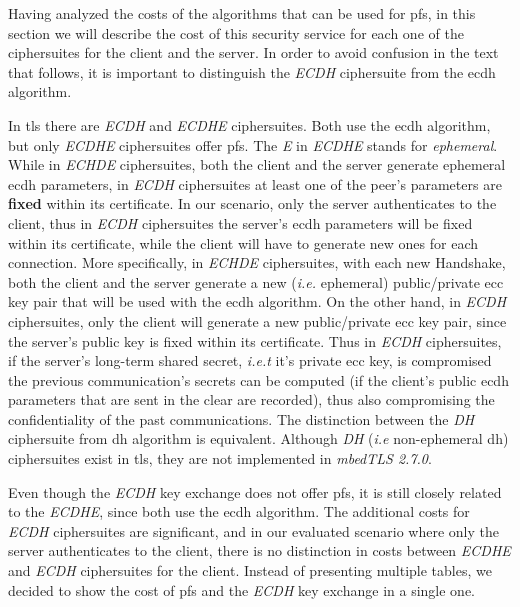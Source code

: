 \documentclass{llncs}
\begin{document}
Having analyzed the costs of the algorithms that can be used for \gls{pfs}, in this section we will describe the cost of this security service
for each one of the ciphersuites for the client and the server. In order to avoid confusion in the text that follows, it is important to
distinguish the \textit{ECDH} ciphersuite from the \gls{ecdh} algorithm.

In \gls{tls} there are \textit{ECDH} and \textit{ECDHE} ciphersuites. Both use the \gls{ecdh} algorithm, but only \textit{ECDHE} ciphersuites
offer \gls{pfs}. The \textit{E} in \textit{ECDHE} stands for \textit{ephemeral}. While in \textit{ECHDE} ciphersuites, both the client and the server
generate ephemeral \gls{ecdh} parameters, in \textit{ECDH} ciphersuites at least one of the peer's parameters are \textbf{fixed}
within its certificate. In our scenario, only the server authenticates to the client, thus in \textit{ECDH} ciphersuites the server's
\gls{ecdh} parameters will be fixed within its certificate, while the client will have to generate new ones for each connection.
More specifically, in \textit{ECHDE} ciphersuites, with each  new Handshake, both the client and the server generate a new (\textit{i.e.} ephemeral)
public/private \gls{ecc} key pair that will be used with the \gls{ecdh} algorithm. On the other hand, in \textit{ECDH} ciphersuites, only the client
will generate a new public/private \gls{ecc} key pair, since the server's public key is fixed within its certificate. Thus in \textit{ECDH}
ciphersuites, if the server's long-term shared secret, \textit{i.e.t} it's private \gls{ecc} key, is compromised the previous communication's secrets
can be computed (if the client's public \gls{ecdh} parameters that are sent in the clear are recorded), thus also compromising the confidentiality of
the past communications. The distinction between the \textit{DH} ciphersuite from \gls{dh} algorithm is equivalent. Although \textit{DH} (\textit{i.e}
non-ephemeral \gls{dh}) ciphersuites exist in \gls{tls}, they are not implemented in \textit{mbedTLS 2.7.0}.

Even though the \textit{ECDH} key exchange does not offer \gls{pfs}, it is still closely related to the \textit{ECDHE}, since both use
the \gls{ecdh} algorithm. The additional costs for \textit{ECDH} ciphersuites are significant, and in our evaluated scenario where only the server
authenticates to the client, there is no distinction in costs between \textit{ECDHE} and \textit{ECDH} ciphersuites for the client. Instead of
presenting multiple tables, we decided to show the cost of \gls{pfs} and the \textit{ECDH} key exchange in a single one.
\end{document}
